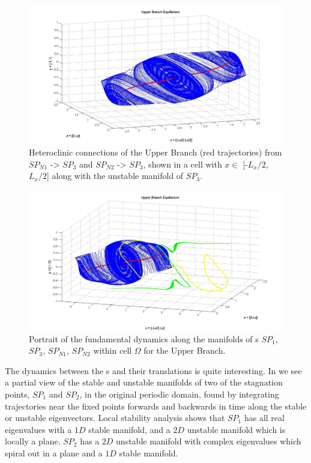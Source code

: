 \documentclass[letter,12pt,openany]{article}
\begin{document}
    \begin{figure}[!h]
\includegraphics[width=1.0\textwidth]{man14_june3.jpg}
  \caption{
   Heteroclinic connections of the Upper Branch (red trajectories) from $SP_{N1}$ -> $SP_3$ and $SP_{N2}$ -> $SP_3$, shown in a cell with $x \in$ [-$L_x/2$, $L_x/2$] along with the unstable manifold of $SP_3$.
   }
  \label{eltonFig:hetero1}
 \end{figure}




  \begin{figure}[!h]
\includegraphics[width=1.1\textwidth]{june4_fig7.jpg}
  \caption{
   Portrait of the fundamental dynamics along the manifolds of \stagp s $SP_1$, $SP_3$, $SP_{N1}$, $SP_{N2}$ within cell $\Omega$ for the Upper Branch.
   }
  \label{eltonFig:hetero2}
 \end{figure}


 


The dynamics between the \stagp s and their translations is
   quite interesting. In  we see a partial view of the stable and unstable manifolds of two of the stagnation points, $SP_1$ and $SP_2$, in the original periodic domain, found by integrating trajectories near the fixed points forwards and backwards in time along the stable or unstable eigenvectors. Local stability analysis shows that $SP_1$ has all real eigenvalues
with a $1D$ stable manifold,
and a $2D$ unstable manifold which is locally a plane. $SP_2$
 has a $2D$ unstable manifold with complex eigenvalues which spiral
 out in a plane and a $1D$ stable manifold. 
 
\end{document}
